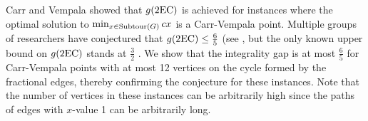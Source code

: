 Carr and Vempala \cite{Carr2004} showed that $g(\2ec)$ is achieved for instances where the optimal solution to $\min_{x\in \operatorname{{Subtour}}(G)}cx$ is a Carr-Vempala point. Multiple groups of researchers have conjectured that $g(\2ec)\leq \frac{6}{5}$ (see \cite{alexander2006integrality,boydlegault,hn19}, but the only known upper bound on $g(\2ec)$ stands at $\frac{3}{2}$ \cite{wolsey}. We show that the integrality gap is at most $\frac{6}{5}$ for Carr-Vempala points with at most 12 vertices on the cycle formed by the fractional edges, thereby confirming the conjecture for these instances. Note that the number of vertices in these instances can be arbitrarily high since the paths of edges with $x$-value 1 can be arbitrarily long.
 
